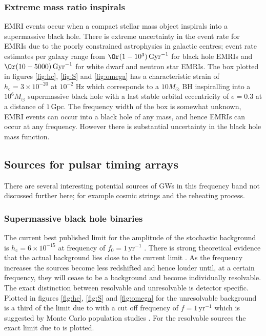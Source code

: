 \documentclass[fleqn,12pt]{iopart}
\newcommand{\Msun}{\ensuremath{M_{ \odot }}}
\newcommand{\sub}[1]{\ensuremath{_\mathrm{#1}}}
\begin{document}
\subsubsection{Extreme mass ratio inspirals}
EMRI events occur when a compact stellar mass object inspirals into a supermassive black hole. There is extreme uncertainty in the event rate for EMRIs due to the poorly constrained astrophysics in galactic centres; event rate estimates per galaxy range from $\Or(1-10^{3})\,\textrm{Gyr}^{-1}$ for black hole EMRIs and $\Or(10-5000)\,\textrm{Gyr}^{-1}$ for white dwarf and neutron star EMRIs. The box plotted in figures \ref{fig:hc}, \ref{fig:S} and \ref{fig:omega} has a characteristic strain of $h\sub{c}=3\times 10^{-20}$ at $10^{-2}\;\textrm{Hz}$ which corresponds to a $10\Msun$ BH inspiralling into a $10^{6}\Msun$ supermassive black hole with a last stable orbital eccentricity of $e=0.3$ at a distance of $1\,\textrm{Gpc}$. The frequency width of the box is somewhat unknown, EMRI events can occur into a black hole of any mass, and hence EMRIs can occur at any frequency. However there is substantial uncertainty in the black hole mass function.




\subsection{Sources for pulsar timing arrays}
There are several interesting potential sources of GWs in this frequency band not discussed further here; for example cosmic strings and the reheating process.

\subsubsection{Supermassive black hole binaries}
The current best published limit for the amplitude of the stochastic background is $h\sub{c}=6\times 10^{-15}$ at frequency of $f_{0}=1\,\textrm{yr}^{-1}$ \citep{VanHaasteren2011}. There is strong theoretical evidence that the actual background lies close to the current limit \citep{McWilliams2012a, Sesana2012a}. As the frequency increases the sources become less redshifted and hence louder until, at a certain frequency, they will cease to be a background and become individually resolvable. The exact distinction between resolvable and unresolvable is detector specific. Plotted in figures \ref{fig:hc}, \ref{fig:S} and \ref{fig:omega} for the unresolvable background is a third of the limit due to \citet{VanHaasteren2011} with a cut off frequency of $f=1\,\textrm{yr}^{-1}$ which is suggested by Monte Carlo population studies \citep{Sesana2008}. For the resolvable sources the exact limit due to \citet{VanHaasteren2011} is plotted.
\end{document}
